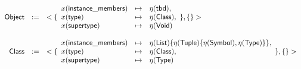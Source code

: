 \documentclass[9pt]{article}
\newcommand{\genref}  [1] {\reft(\mathsf{#1})}
\newcommand{\genname} [1] {\namet(\mathsf{#1})}
\begin{document}
\[
	\begin{array}{rcl}
	\mathsf{Object} &:=& <
		\lbrace
			\begin{array}{lcl}
			\genref{instance\_members} &\mapsto& \genname{tbd},\\
			\genref{type} &\mapsto& \genname{Class},\\
			\genref{supertype} &\mapsto& \genname{Void}
			\end{array}
		\rbrace,
		\lbrace
		\rbrace>\\
	\\
	\mathsf{Class} &:=& <
		\lbrace
			\begin{array}{lcl}
			\genref{instance\_members} &\mapsto& \genname{List}\lbrace \genname{Tuple} \lbrace \genname{Symbol}, \genname{Type} \rbrace \rbrace,\\
			\genref{type} &\mapsto& \genname{Class},\\
			\genref{supertype} &\mapsto& \genname{Type}
			\end{array}
		\rbrace,
		\lbrace
		\rbrace>\\
	\\
	\end{array}
\]
\end{document}
